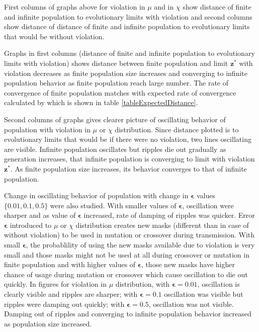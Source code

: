 



First columns of graphs above for violation in $\mu$ and in $\chi$ show distance of finite and infinite population to evolutionary limits with violation and 
second columns show distance of distance of finite and infinite population to evolutionary limits that would be without violation. 

Graphs in first columns (distance of finite and infinite population to evolutionary limits with violation) shows distance between finite population 
and limit $\bm{z}^\ast$ with violation decreases as finite population size increases and converging to infinite population behavior as finite population reach large number. 
The rate of convergence of finite population matches with expected rate of convergence calculated by \cite{Vose1999b} which is shown in table \ref{tableExpectedDistance}.

Second columns of graphs gives clearer picture of oscillating behavior of population with violation in $\mu$ or $\chi$ distribution. 
Since distance plotted is to evolutionary limits that would be if there were no violation, two lines oscillating are visible. Infinite population oscillates but ripples die out gradually as generation increases, that infinite population is converging to limit with violation $\bm{z}^\ast$. As finite population size increases, its behavior converges to that of infinite population. 

Change in oscillating behavior of population with change in $\bm{\epsilon}$ values $\{0.01, 0.1, 0.5\}$ were also studied. With smaller values of $\bm{\epsilon}$, 
oscillation were sharper and as value of $\bm{\epsilon}$ increased, rate of damping of ripples was quicker. Error $\bm{\epsilon}$ introduced 
to $\mu$ or $\chi$ distribution creates new masks (different than in case of without violation) to be used in mutation or crossover during transmission.
With small $\bm{\epsilon}$, the probablility of using the new masks available due to violation is very small and 
those masks might not be used at all during crossover or mutation in finite population and with higher values of $\bm{\epsilon}$, 
those new masks have higher chance of usage during mutation or crossover which cause oscillation to die out quickly. In figures for violation in $\mu$ distribution, with $\bm{\epsilon} = 0.01$, oscillation is clearly visible and ripples are sharper; with $\bm{\epsilon} = 0.1$ oscillation was visible but ripples were damping out quickly;  with $\bm{\epsilon} = 0.5$,
oscillation was not visible. Damping out of ripples and converging to infinite population behavior increased as population size increased. 










 
